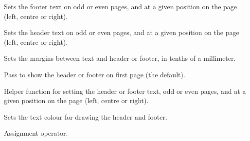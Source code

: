 Sets the footer text on odd or even pages, and at a given position on the page (left, centre or right).

\label{wxrichtextheaderfooterdatasetheadertext}


Sets the header text on odd or even pages, and at a given position on the page (left, centre or right).

\label{wxrichtextheaderfooterdatasetmargins}


Sets the margins between text and header or footer, in tenths of a millimeter.

\label{wxrichtextheaderfooterdatasetshowonfirstpage}


Pass \true to show the header or footer on first page (the default).

\label{wxrichtextheaderfooterdatasettext}


Helper function for setting the header or footer text, odd or even pages, and at a given position on the page (left, centre or right).

\label{wxrichtextheaderfooterdatasettextcolour}


Sets the text colour for drawing the header and footer.

\label{wxrichtextheaderfooterdataoperatorassign}


Assignment operator.

